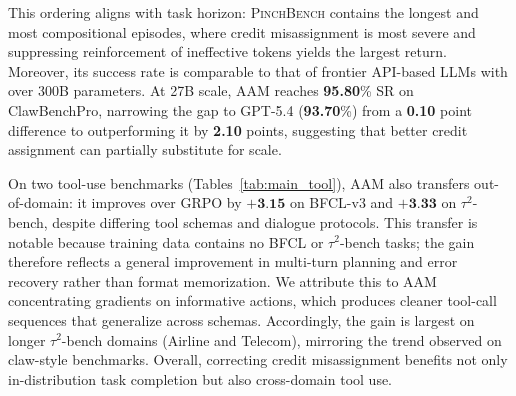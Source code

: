 \documentclass[letterpaper]{article} %
\begin{document}
This ordering aligns with task horizon: \textsc{PinchBench} contains the longest and most compositional episodes, where credit misassignment is most severe and suppressing reinforcement of ineffective tokens yields the largest return.
Moreover, its success rate is comparable to that of frontier API-based LLMs with over 300B parameters.
At 27B scale, AAM reaches \textbf{95.80}\% SR on ClawBenchPro, narrowing the gap to GPT-5.4 (\textbf{93.70}\%) from a \textbf{0.10} point difference to outperforming it by \textbf{2.10} points, suggesting that better credit assignment can partially substitute for scale.

On two tool-use benchmarks (Tables~\ref{tab:main_tool}), AAM also transfers out-of-domain: 
it improves over GRPO by $+\textbf{3.15}$ on BFCL-v3 and $+\textbf{3.33}$ on $\tau^2$-bench, despite differing tool schemas and dialogue protocols.
This transfer is notable because training data contains no BFCL or $\tau^2$-bench tasks; the gain therefore reflects a general improvement in multi-turn planning and error recovery rather than format memorization.
We attribute this to AAM concentrating gradients on informative actions, which produces cleaner tool-call sequences that generalize across schemas.
Accordingly, the gain is largest on longer $\tau^2$-bench domains (Airline and Telecom), mirroring the trend observed on claw-style benchmarks.
Overall, correcting credit misassignment benefits not only in-distribution task completion but also cross-domain tool use.
\end{document}
